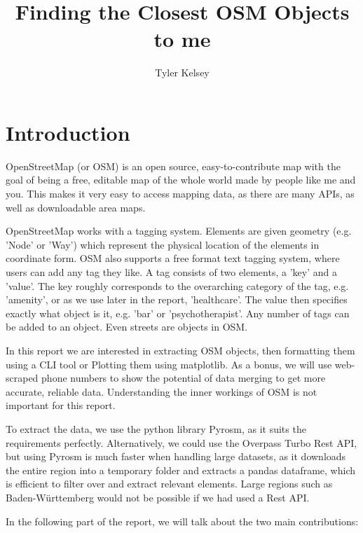 \documentclass[runningheads]{llncs}
\begin{document}
%
\title{Finding the Closest OSM Objects to me}
%
%
\author{Tyler Kelsey}
%
\maketitle              %
%
\section{Introduction}
OpenStreetMap (or OSM) is an open source, easy-to-contribute map with the goal of being a free, editable map of the whole world made by people like me and you. This makes it very easy to access mapping data, as there are many APIs, as well as downloadable area maps.

OpenStreetMap works with a tagging system. Elements are given geometry (e.g. 'Node' or 'Way') which represent the physical location of the elements in coordinate form. OSM also supports a free format text tagging system, where users can add any tag they like. A tag consists of two elements, a 'key' and a 'value'. The key roughly corresponds to the overarching category of the tag, e.g. 'amenity', or as we use later in the report, 'healthcare'. The value then specifies exactly what object is it, e.g. 'bar' or 'psychotherapist'. Any number of tags can be added to an object. Even streets are objects in OSM.

In this report we are interested in extracting OSM objects, then formatting them using a CLI tool or Plotting them using matplotlib. As a bonus, we will use web-scraped phone numbers to show the potential of data merging to get more accurate, reliable data. Understanding the inner workings of OSM is not important for this report. 

To extract the data, we use the python library Pyrosm, as it suits the requirements perfectly. Alternatively, we could use the Overpass Turbo Rest API, but using Pyrosm is much faster when handling large datasets, as it downloads the entire region into a temporary folder and extracts a pandas dataframe, which is efficient to filter over and extract relevant elements. Large regions such as Baden-Württemberg would not be possible if we had used a Rest API.

In the following part of the report, we will talk about the two main contributions:
\end{document}
